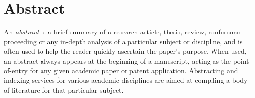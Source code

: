%
%

\section*{Abstract}

An \emph{abstract} is a brief summary of a research article, thesis, review, 
conference proceeding or any in-depth analysis of a particular subject or 
discipline, and is often used to help the reader quickly ascertain the paper's 
purpose. When used, an abstract always appears at the beginning of a manuscript, 
acting as the point-of-entry for any given academic paper or patent application. 
Abstracting and indexing services for various academic disciplines are aimed at 
compiling a body of literature for that particular subject.

